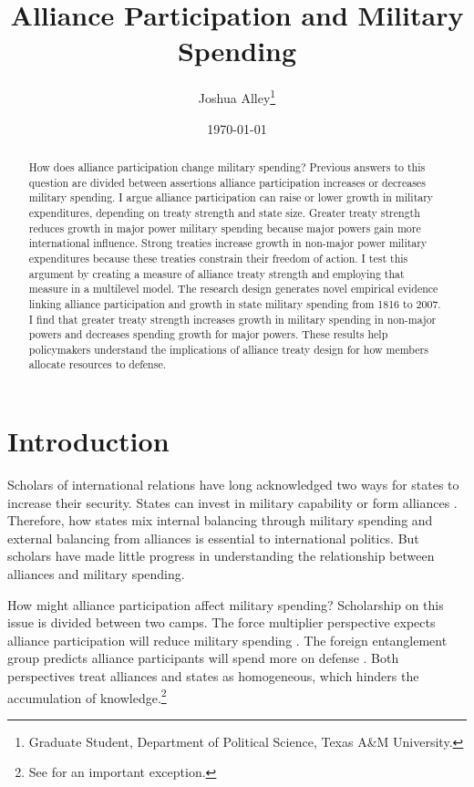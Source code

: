 \documentclass[12pt]{article}
\title{\textbf{Alliance Participation and Military Spending}}
\author{Joshua Alley\footnote{Graduate Student,
Department of Political Science, Texas A\&M University.}}
\date{{\normalsize \today}}
\begin{document}
\maketitle 

\newpage 

\doublespace 

\begin{abstract}
How does alliance participation change military spending? 
Previous answers to this question are divided between assertions alliance participation increases or decreases military spending. 
I argue alliance participation can raise or lower growth in military expenditures, depending on treaty strength and state size. 
Greater treaty strength reduces growth in major power military spending because major powers gain more international influence. 
Strong treaties increase growth in non-major power military expenditures because these treaties constrain their freedom of action. 
I test this argument by creating a measure of alliance treaty strength and employing that measure in a multilevel model. 
The research design generates novel empirical evidence linking alliance participation and growth in state military spending from 1816 to 2007. 
I find that greater treaty strength increases growth in military spending in non-major powers and decreases spending growth for major powers.  
These results help policymakers understand the implications of alliance treaty design for how members allocate resources to defense. 
\end{abstract}



\section{Introduction}


Scholars of international relations have long acknowledged two ways for states to increase their security. 
States can invest in military capability or form alliances \citep{Morgenthau1948}.
Therefore, how states mix internal balancing through military spending and external balancing from alliances is essential to international politics. 
But scholars have made little progress in understanding the relationship between alliances and military spending. 


How might alliance participation affect military spending? 
Scholarship on this issue is divided between two camps. 
The force multiplier perspective expects alliance participation will reduce military spending \citep{Morrow1993, Conybeare1994, DigiuseppePoast2016}. 
The foreign entanglement group predicts alliance participants will spend more on defense \citep{Diehl1994, MorganPalmer2006}. 
Both perspectives treat alliances and states as homogeneous, which hinders the accumulation of knowledge.\footnote{See \citet{DigiuseppePoast2016} for an important exception.} 
\end{document}

